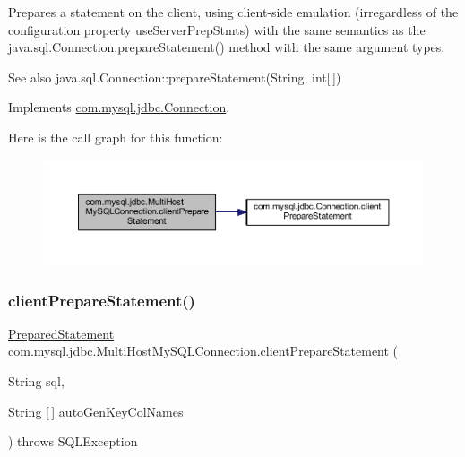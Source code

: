 Prepares a statement on the client, using client-\/side emulation (irregardless of the configuration property \textquotesingle{}use\+Server\+Prep\+Stmts\textquotesingle{}) with the same semantics as the java.\+sql.\+Connection.\+prepare\+Statement() method with the same argument types.

\begin{DoxySeeAlso}{See also}
java.\+sql.\+Connection\+::prepare\+Statement(\+String, int\mbox{[}$\,$\mbox{]}) 
\end{DoxySeeAlso}


Implements \mbox{\hyperlink{interfacecom_1_1mysql_1_1jdbc_1_1_connection_a0a5607f53ef9d376f1ff02fcffd038bf}{com.\+mysql.\+jdbc.\+Connection}}.

Here is the call graph for this function\+:
\nopagebreak
\begin{figure}[H]
\begin{center}
\leavevmode
\includegraphics[width=350pt]{classcom_1_1mysql_1_1jdbc_1_1_multi_host_my_s_q_l_connection_a943b6c7d2931f82f72806b47271f259c_cgraph}
\end{center}
\end{figure}
\mbox{\label{classcom_1_1mysql_1_1jdbc_1_1_multi_host_my_s_q_l_connection_aa9841555ae046be40f86ba4a2e4f79ed}} 
\subsubsection{\texorpdfstring{client\+Prepare\+Statement()}{clientPrepareStatement()}\hspace{0.1cm}{\footnotesize\ttfamily [5/6]}}
{\footnotesize\ttfamily \mbox{\hyperlink{classcom_1_1mysql_1_1jdbc_1_1_prepared_statement}{Prepared\+Statement}} com.\+mysql.\+jdbc.\+Multi\+Host\+My\+S\+Q\+L\+Connection.\+client\+Prepare\+Statement (\begin{DoxyParamCaption}\item[{String}]{sql,  }\item[{String \mbox{[}$\,$\mbox{]}}]{auto\+Gen\+Key\+Col\+Names }\end{DoxyParamCaption}) throws S\+Q\+L\+Exception}

